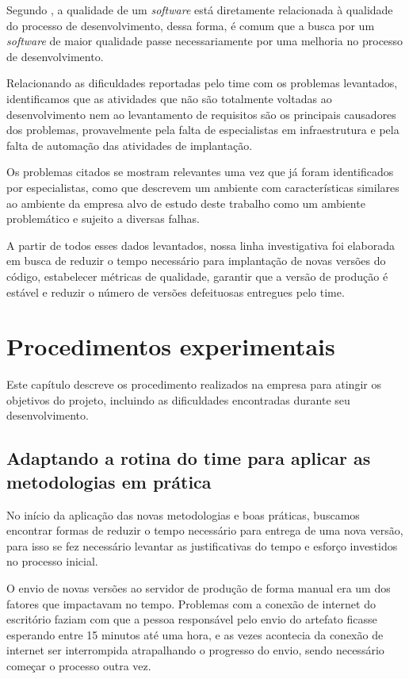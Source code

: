 \documentclass[
	12pt,				%
	openright,			%
	oneside,			%
	a4paper,			%
	english,			%
	french,				%
	spanish,			%
	brazil,				%
	]{abntex2}
\begin{document}
Segundo , a qualidade de um \textit{software} está diretamente relacionada à qualidade do processo de desenvolvimento, dessa forma, é comum que a busca por um \textit{software} de maior qualidade passe necessariamente por uma melhoria no processo de desenvolvimento.

Relacionando as dificuldades reportadas pelo time com os problemas levantados, identificamos que as atividades que não são totalmente voltadas ao desenvolvimento nem ao levantamento de requisitos são os principais causadores dos problemas, provavelmente pela falta de especialistas em infraestrutura e pela falta de automação das atividades de implantação.

Os problemas citados se mostram relevantes uma vez que já foram identificados por especialistas, como  que descrevem um ambiente com características similares ao ambiente da empresa alvo de estudo deste trabalho como um ambiente problemático e sujeito a diversas falhas.

A partir de todos esses dados levantados, nossa linha investigativa foi elaborada em busca de reduzir o tempo necessário para implantação de novas versões do código, estabelecer métricas de qualidade, garantir que a versão de produção é estável e reduzir o número de versões defeituosas entregues pelo time.


\chapter{Procedimentos experimentais}

Este capítulo descreve os procedimento realizados na empresa para atingir os objetivos do projeto, incluindo as dificuldades encontradas durante seu desenvolvimento.

\section{Adaptando a rotina do time para aplicar as metodologias em prática}

No início da aplicação das novas metodologias e boas práticas, buscamos encontrar formas de reduzir o tempo necessário para entrega de uma nova versão, para isso se fez necessário levantar as justificativas do tempo e esforço investidos no processo inicial.

O envio de novas versões ao servidor de produção de forma manual era um dos fatores que impactavam no tempo. Problemas com a conexão de internet do escritório faziam com que a pessoa responsável pelo envio do artefato ficasse esperando entre 15 minutos até uma hora, e as vezes acontecia da conexão de internet ser interrompida atrapalhando o progresso do envio, sendo necessário começar o processo outra vez.
\end{document}
